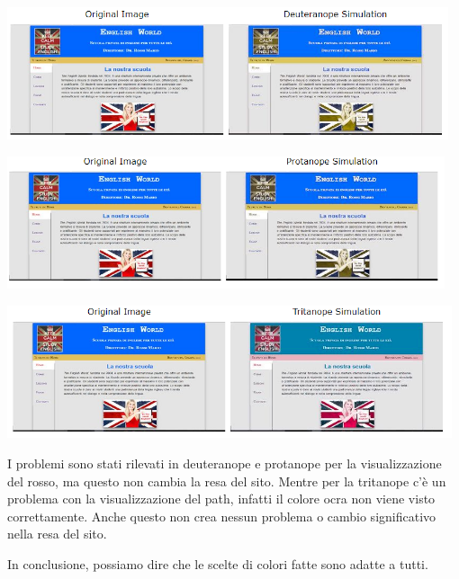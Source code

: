 \documentclass[12pt, a4paper]{article}
\begin{document}
\includegraphics[height=3.9cm]{img/Deuteranope.PNG}\par
\includegraphics[height=3.9cm]{img/Protanope.PNG}\par
\includegraphics[height=3.9cm]{img/Tritanope.PNG}\par

I problemi sono stati rilevati in deuteranope e protanope per la visualizzazione del rosso,
ma questo non cambia la resa del sito. Mentre per la tritanope c’è un problema con la
visualizzazione del path, infatti il colore ocra non viene visto correttamente. Anche questo non crea nessun problema o cambio significativo nella resa del sito.\par

In conclusione, possiamo dire che le scelte di colori fatte sono adatte a tutti.
\end{document}
